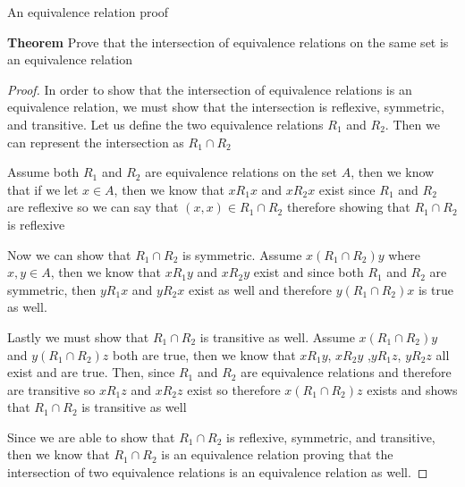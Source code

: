 An equivalence relation proof

\textbf{Theorem}
Prove that the intersection of equivalence relations on the same set is an equivalence relation

\begin{proof}
In order to show that the intersection of equivalence relations is an equivalence relation, we must show that the intersection is reflexive, symmetric, and transitive. Let us define the two equivalence relations $R_1$ and $R_2$. Then we can represent the intersection as $R_1\cap R_2$

 Assume both $R_1$ and $R_2$ are equivalence relations on the set $A$, then we know that if we let $x\in A$, then we know that $xR_1x$ and $xR_2x$ exist since $R_1$ and $R_2$ are reflexive so we can say that $(x,x)\in R_1\cap R_2$ therefore showing that $R_1\cap R_2$ is reflexive
 
 Now we can show that $R_1\cap R_2$ is symmetric. Assume $x(R_1\cap R_2)y$ where $x,y \in A$, then we know that $xR_1y$ and $xR_2y$ exist and since both $R_1$ and $R_2$ are symmetric, then $yR_1x$ and $yR_2x$ exist as well and therefore $y(R_1\cap R_2)x$ is true as well.
 
 Lastly we must show that $R_1\cap R_2$ is transitive as well. Assume $x(R_1\cap R_2)y$ and $y(R_1\cap R_2)z$ both are true, then we know that $xR_1y$, $xR_2y$ ,$yR_1z$, $yR_2z$ all exist and are true. Then, since $R_1$ and $R_2$ are equivalence relations and therefore are transitive so $xR_1z$ and $xR_2z$ exist so therefore $x(R_1\cap R_2)z$ exists and shows that $R_1\cap R_2$ is transitive as well

Since we are able to show that $R_1\cap R_2$ is reflexive, symmetric, and transitive, then we know that $R_1\cap R_2$ is an equivalence relation proving that the intersection of two equivalence relations is an equivalence relation as well.
\end{proof}